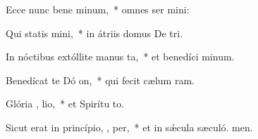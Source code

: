 \item Ecce nunc bene minum,~* omnes ser mini:
\item Qui statis   mini,~* in átriis domus De tri.
\item In nóctibus extóllite manus   ta,~* et benedíci minum.
\item Benedícat te Dó  on,~* qui fecit cælum  ram.
\item Glória ,  lio,~* et Spirítu to.
\item Sicut erat in princípio,  ,  per,~* et in sǽcula sæculó. men.
